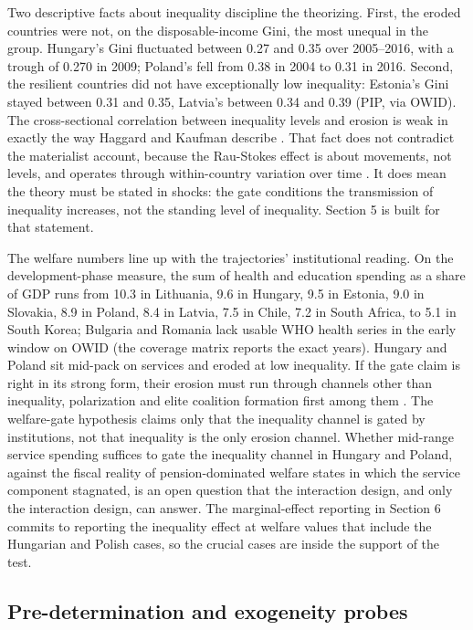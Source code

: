 \documentclass[11pt,letterpaper]{article}
\begin{document}
Two descriptive facts about inequality discipline the theorizing. First, the eroded countries were not, on the disposable-income Gini, the most unequal in the group. Hungary's Gini fluctuated between 0.27 and 0.35 over 2005--2016, with a trough of 0.270 in 2009; Poland's fell from 0.38 in 2004 to 0.31 in 2016. Second, the resilient countries did not have exceptionally low inequality: Estonia's Gini stayed between 0.31 and 0.35, Latvia's between 0.34 and 0.39 (PIP, via OWID). The cross-sectional correlation between inequality levels and erosion is weak in exactly the way Haggard and Kaufman describe \citep{HaggardKaufman2021}. That fact does not contradict the materialist account, because the Rau-Stokes effect is about movements, not levels, and operates through within-country variation over time \citep{RauStokes2025}. It does mean the theory must be stated in shocks: the gate conditions the transmission of inequality increases, not the standing level of inequality. Section 5 is built for that statement.

The welfare numbers line up with the trajectories' institutional reading. On the development-phase measure, the sum of health and education spending as a share of GDP runs from 10.3 in Lithuania, 9.6 in Hungary, 9.5 in Estonia, 9.0 in Slovakia, 8.9 in Poland, 8.4 in Latvia, 7.5 in Chile, 7.2 in South Africa, to 5.1 in South Korea; Bulgaria and Romania lack usable WHO health series in the early window on OWID (the coverage matrix reports the exact years). Hungary and Poland sit mid-pack on services and eroded at low inequality. If the gate claim is right in its strong form, their erosion must run through channels other than inequality, polarization and elite coalition formation first among them \citep{HaggardKaufman2021, Svolik2019}. The welfare-gate hypothesis claims only that the inequality channel is gated by institutions, not that inequality is the only erosion channel. Whether mid-range service spending suffices to gate the inequality channel in Hungary and Poland, against the fiscal reality of pension-dominated welfare states in which the service component stagnated, is an open question that the interaction design, and only the interaction design, can answer. The marginal-effect reporting in Section 6 commits to reporting the inequality effect at welfare values that include the Hungarian and Polish cases, so the crucial cases are inside the support of the test.

\subsection{Pre-determination and exogeneity probes}
\end{document}
